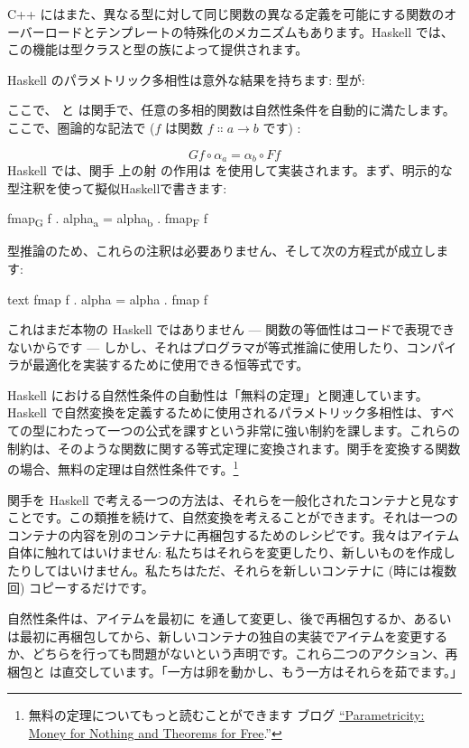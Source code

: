 C++ にはまた、異なる型に対して同じ関数の異なる定義を可能にする関数のオーバーロードとテンプレートの特殊化のメカニズムもあります。Haskell では、この機能は型クラスと型の族によって提供されます。

Haskell のパラメトリック多相性は意外な結果を持ちます: 型が: 

ここで、 と  は関手で、任意の多相的関数は自然性条件を自動的に満たします。ここで、圏論的な記法で ($f$ は関数 $f \Colon a \to b$ です) : 

\[G f \circ \alpha_a = \alpha_b \circ F f\]
Haskell では、関手  上の射  の作用は  を使用して実装されます。まず、明示的な型注釈を使って擬似Haskellで書きます: 

\begin{snipv}
fmap\textsubscript{G} f . alpha\textsubscript{a} = alpha\textsubscript{b} . fmap\textsubscript{F} f
\end{snipv}
型推論のため、これらの注釈は必要ありません、そして次の方程式が成立します: 

\begin{snip}{text}
fmap f . alpha = alpha . fmap f
\end{snip}
これはまだ本物の Haskell ではありません --- 関数の等価性はコードで表現できないからです --- しかし、それはプログラマが等式推論に使用したり、コンパイラが最適化を実装するために使用できる恒等式です。

Haskell における自然性条件の自動性は「無料の定理」と関連しています。Haskell で自然変換を定義するために使用されるパラメトリック多相性は、すべての型にわたって一つの公式を課すという非常に強い制約を課します。これらの制約は、そのような関数に関する等式定理に変換されます。関手を変換する関数の場合、無料の定理は自然性条件です。\footnote{
  無料の定理についてもっと読むことができます
  ブログ \href{https://bartoszmilewski.com/2014/09/22/parametricity-money-for-nothing-and-theorems-for-free/}{``Parametricity:
    Money for Nothing and Theorems for Free}.''}

関手を Haskell で考える一つの方法は、それらを一般化されたコンテナと見なすことです。この類推を続けて、自然変換を考えることができます。それは一つのコンテナの内容を別のコンテナに再梱包するためのレシピです。我々はアイテム自体に触れてはいけません: 私たちはそれらを変更したり、新しいものを作成したりしてはいけません。私たちはただ、それらを新しいコンテナに (時には複数回) コピーするだけです。

自然性条件は、アイテムを最初に  を通して変更し、後で再梱包するか、あるいは最初に再梱包してから、新しいコンテナの独自の実装でアイテムを変更するか、どちらを行っても問題がないという声明です。これら二つのアクション、再梱包と  は直交しています。「一方は卵を動かし、もう一方はそれらを茹でます。」

